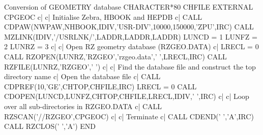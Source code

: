 \begin{XMPt}{Conversion of GEOMETRY database}
      CHARACTER*80   CHFILE
      EXTERNAL       CPGEOC
c|
c|    Initialise Zebra, HBOOK and HEPDB
c|
      CALL CDPAW(NWPAW,NHBOOK,IDIV,'USR-DIV',10000,150000,'ZPU',IRC)
      CALL MZLINK(IDIV,'/USRLNK/',LADDR,LADDR,LADDR)
      LUNCD  = 1
      LUNFZ  = 2
      LUNRZ  = 3
c|
c|    Open RZ geometry database (RZGEO.DATA)
c|
      LRECL  = 0
      CALL RZOPEN(LUNRZ,'RZGEO','rzgeo.data',' ',LRECL,IRC)
      CALL RZFILE(LUNRZ,'RZGEO',' ')
c|
c|    Find the database file and construct the top directory name
c|    Open the database file
c|
      CALL CDPREF(10,'GE',CHTOP,CHFILE,IRC)
      LRECL  = 0
      CALL CDOPEN(LUNCD,LUNFZ,CHTOP,CHFILE,LRECL,IDIV,' ',IRC)
c|
c|    Loop over all sub-directories in RZGEO.DATA
c|
      CALL RZSCAN('//RZGEO',CPGEOC)
c|
c|    Terminate
c|
      CALL CDEND(' ','A',IRC)
      CALL RZCLOS(' ','A')
      END


\end{XMPt}
